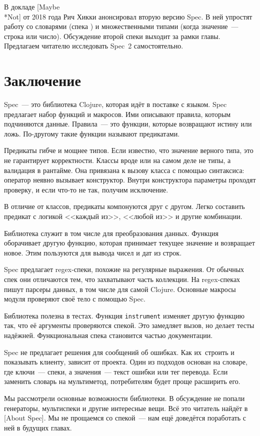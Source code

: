 
В докладе [Maybe\\*Not]
от 2018 года Рич Хикки анонсировал вторую версию Spec. В ней упростят работу со
словарями (спека ) и множественными типами (когда значение~---
строка или число). Обсуждение второй спеки выходит за рамки главы. Предлагаем
читателю исследовать Spec~2 самостоятельно.

\section{Заключение}

Spec~--- это библиотека Clojure, которая идёт в поставке с языком. Spec
предлагает набор функций и макросов. Ими описывают правила, которым подчиняются
данные. Правила~--- это функции, которые возвращают истину или ложь. По-другому
такие функции называют предикатами.

Предикаты гибче и мощнее типов. Если известно, что значение верного типа, это не
гарантирует корректности. Классы вроде  или  на
самом деле не типы, а валидация в рантайме. Она привязана к вызову класса с
помощью синтаксиса: оператор  неявно вызывает конструктор. Внутри
конструктора параметры проходят проверку, и если что-то не так, получим
исключение.

В отличие от классов, предикаты компонуются друг с другом. Легко составить
предикат с логикой <<каждый из>>, <<любой из>> и другие комбинации.

Библиотека служит в том числе для преобразования данных. Функция
 оборачивает другую функцию, которая принимает текущее значение
и возвращает новое. Этим пользуются для вывода чисел и дат из строк.

Spec предлагает regex-спеки, похожие на регулярные выражения. От обычных спек
они отличаются тем, что захватывают часть коллекции. На regex-спеках пишут
парсеры данных, в том числе для самой Clojure. Основные макросы модуля
 проверяют своё тело с помощью Spec.

Библиотека полезна в тестах. Функция \texttt{in\-stru\-ment} изменяет другую
функцию так, что её аргументы проверяются спекой. Это замедляет вызов, но делает
тесты надёжней. Функциональная спека становится частью документации.

Spec не предлагает решения для сообщений об ошибках. Как их~строить и показывать
клиенту, зависит от проекта. Один из подходов основан на словаре, где ключи~---
спеки, а значения~--- текст ошибки или тег перевода. Если заменить словарь на
мультиметод, потребителям будет проще расширить его.

Мы рассмотрели основные возможности библиотеки. В обсуждение не попали
генераторы, мультиспеки и другие интересные вещи. Всё это читатель найдёт в
[About Spec].
Мы не прощаемся со спекой~--- нам ещё доведётся поработать с ней в будущих главах.
